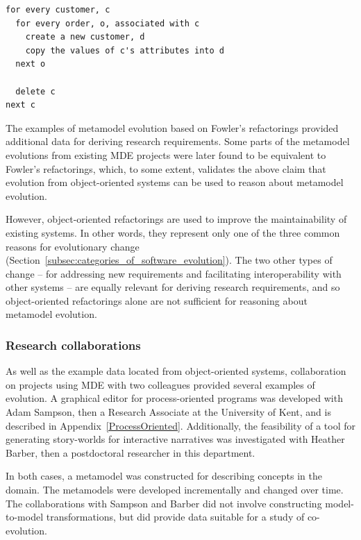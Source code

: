\begin{lstlisting}[caption=Pseudo code migration strategy for the refactoring in Figure~\ref{fig:refactoring}., label=lst:refactoring]
for every customer, c
  for every order, o, associated with c
    create a new customer, d
    copy the values of c's attributes into d
  next o
	
  delete c
next c
\end{lstlisting}

The examples of metamodel evolution based on Fowler's refactorings provided additional data for deriving research requirements. Some parts of the metamodel evolutions from existing MDE projects were later found to be equivalent to Fowler's refactorings, which, to some extent, validates the above claim that evolution from object-oriented systems can be used to reason about metamodel evolution.

However, object-oriented refactorings are used to improve the maintainability of existing systems. In \cc other words, they represent only one of the three common reasons for evolutionary change (Section~\ref{subsec:categories_of_software_evolution}). The two other types of change -- for addressing new requirements and facilitating interoperability with other systems -- are equally relevant for deriving research requirements, and so object-oriented refactorings alone are not sufficient for reasoning about metamodel evolution.

\subsubsection{Research collaborations}
As well as the example data located from object-oriented systems, collaboration on projects using MDE with two colleagues provided several examples of evolution. A graphical editor for process-oriented programs was developed with Adam Sampson, then a Research Associate at the University of Kent, and is described in Appendix~\ref{ProcessOriented}. Additionally, the feasibility of a tool for generating story-worlds for interactive narratives was investigated with Heather Barber, then a postdoctoral researcher in this department.

In both cases, a metamodel was constructed for describing concepts in the domain. The metamodels were developed incrementally and changed over time. The collaborations with Sampson and Barber did not involve constructing model-to-model transformations, but did provide data suitable for a study of co-evolution.

